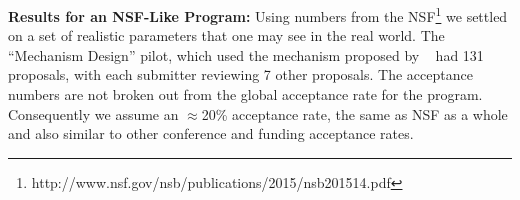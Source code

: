 \documentclass[letterpaper]{article}
\newcommand{\citet}[1]{\citeauthor{#1}~\shortcite{#1}}
\begin{document}
%

\smallskip
\noindent
\textbf{Results for an NSF-Like Program:}
Using numbers from the NSF\footnote{http://www.nsf.gov/nsb/publications/2015/nsb201514.pdf} we settled on a set of realistic parameters that one may see in the real world. The ``Mechanism Design'' pilot, which used the mechanism proposed by \citet{MeSa09a} had 131 proposals, with each submitter reviewing 7 other proposals. 
The acceptance numbers are not broken out from the global acceptance rate for the program. Consequently we assume an $\approx$20\% acceptance rate, the same as NSF as a whole and also similar to other conference and funding acceptance rates. 
\end{document}
